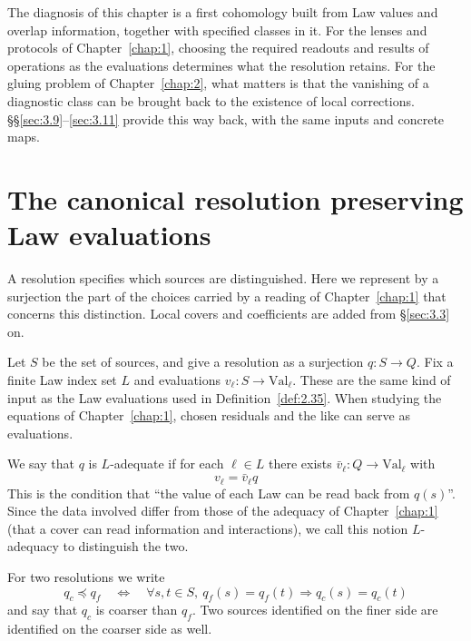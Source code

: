 The diagnosis of this chapter is a first cohomology built from Law values and overlap
information, together with specified classes in it. For the lenses and protocols of
Chapter~\ref{chap:1}, choosing the required readouts and results of operations as the
evaluations determines what the resolution retains. For the gluing problem of
Chapter~\ref{chap:2}, what matters is that the vanishing of a diagnostic class can be
brought back to the existence of local corrections.
\S\S\ref{sec:3.9}--\ref{sec:3.11} provide this way back, with the same inputs and
concrete maps.

\section{The canonical resolution preserving Law evaluations}\label{sec:3.1}

A resolution specifies which sources are distinguished. Here we represent by a
surjection the part of the choices carried by a reading of Chapter~\ref{chap:1} that
concerns this distinction. Local covers and coefficients are added from
\S\ref{sec:3.3} on.

\begin{definition}\label{def:3.1}

Let $S$ be the set of sources, and give a resolution as a surjection $q:S\to Q$.
Fix a finite Law index set $L$ and evaluations
$v_\ell:S\to\mathrm{Val}_\ell$.
These are the same kind of input as the Law evaluations used in Definition~\ref{def:2.35}.
When studying the equations of Chapter~\ref{chap:1}, chosen residuals and the like can
serve as evaluations.

We say that $q$ is $L$-adequate if for each $\ell\in L$ there exists
$\bar v_\ell:Q\to\mathrm{Val}_\ell$ with
\begin{equation*}
v_\ell=\bar v_\ell q
\tag{3.1}\label{eq:3.1}
\end{equation*}
This is the condition that ``the value of each Law can be read back from $q(s)$''.
Since the data involved differ from those of the adequacy of Chapter~\ref{chap:1} (that a cover
can read information and interactions), we call this notion $L$-adequacy to distinguish
the two.

For two resolutions we write
\begin{equation*}
q_c\preceq q_f
\quad\Longleftrightarrow\quad
\forall s,t\in S,\
q_f(s)=q_f(t)\Rightarrow q_c(s)=q_c(t)
\tag{3.2}\label{eq:3.2}
\end{equation*}
and say that $q_c$ is coarser than $q_f$.
Two sources identified on the finer side are identified on the coarser side as well.

\end{definition}

